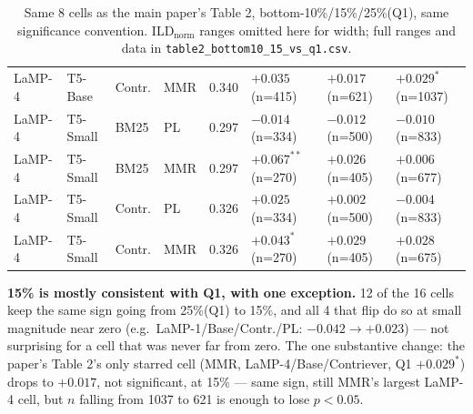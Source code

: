 \documentclass[10pt]{article}
\begin{document}
\begin{table}[h]
\begin{tabular}{@{}llllrlll@{}}
LaMP-4 & T5-Base & Contr. & MMR & 0.340 & $+0.035$ (n{=}415) & $+0.017$ (n{=}621) & $+0.029^{*}$ (n{=}1037) \\
LaMP-4 & T5-Small & BM25 & PL & 0.297 & $-0.014$ (n{=}334) & $-0.012$ (n{=}500) & $-0.010$ (n{=}833) \\
LaMP-4 & T5-Small & BM25 & MMR & 0.297 & $+0.067^{**}$ (n{=}270) & $+0.026$ (n{=}405) & $+0.006$ (n{=}677) \\
LaMP-4 & T5-Small & Contr. & PL & 0.326 & $+0.025$ (n{=}334) & $+0.002$ (n{=}500) & $-0.004$ (n{=}833) \\
LaMP-4 & T5-Small & Contr. & MMR & 0.326 & $+0.043^{*}$ (n{=}270) & $+0.029$ (n{=}405) & $+0.028$ (n{=}675) \\
\bottomrule
\end{tabular}
\caption{Same 8 cells as the main paper's Table 2, bottom-10\%/15\%/25\%(Q1),
same significance convention. ILD$_{\text{norm}}$ ranges omitted here for width;
full ranges and data in \texttt{table2\_bottom10\_15\_vs\_q1.csv}.}
\label{tab:bottom15}
\end{table}

\textbf{15\% is mostly consistent with Q1, with one exception.} 12 of the 16
cells keep the same sign going from 25\%(Q1) to 15\%, and all 4 that flip do so
at small magnitude near zero (e.g.\ LaMP-1/Base/Contr./PL: $-0.042\to+0.023$) ---
not surprising for a cell that was never far from zero. The one substantive
change: the paper's Table 2's only starred cell (MMR, LaMP-4/Base/Contriever, Q1
$+0.029^{*}$) drops to $+0.017$, not significant, at 15\% --- same sign, still
MMR's largest LaMP-4 cell, but $n$ falling from 1037 to 621 is enough to lose
$p{<}0.05$.
\end{document}

